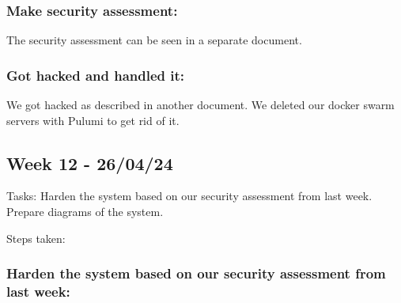 \subsubsection{Make security assessment:}
\label{log:make-security-assessment}

The security assessment can be seen in a separate document.

\subsubsection{Got hacked and handled it:}
\label{log:got-hacked-and-handled-it}

We got hacked as described in another document. We deleted our docker
swarm servers with Pulumi to get rid of it.

\subsection{Week 12 - 26/04/24}
\label{week12}

Tasks: Harden the system based on our security assessment from last week. Prepare diagrams of the system.

Steps taken:

\subsubsection{Harden the system based on our security assessment from last week:}
\label{log:harden-the-system-based-on-our-security-assessment-from-last-week}

